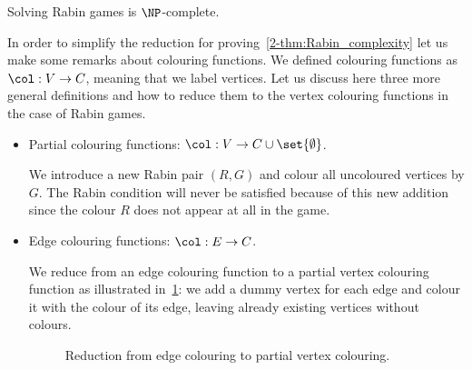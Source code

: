\begin{theorem}
\label{2-thm:Rabin_complexity}
Solving Rabin games is $\NP$-complete.
\end{theorem}

In order to simplify the reduction for proving~\cref{2-thm:Rabin_complexity} let us make some remarks about colouring functions.
We defined colouring functions as $\col : V \to C$, meaning that we label vertices.
Let us discuss here three more general definitions and how to reduce them to the vertex colouring functions
in the case of Rabin games.
\begin{itemize}
	\item Partial colouring functions: $\col : V \to C \cup \set{\emptyset}$.

We introduce a new Rabin pair $(R,G)$ and colour all uncoloured vertices by $G$.
The Rabin condition will never be satisfied because of this new addition 
since the colour $R$ does not appear at all in the game.

	\item Edge colouring functions: $\col : E \to C$.

We reduce from an edge colouring function to a partial vertex colouring function as illustrated in~\cref{2-fig:reduction_edge_colouring}:
we add a dummy vertex for each edge and colour it with the colour of its edge, leaving already existing vertices without colours. 

\begin{figure}[!ht]
\centering
\caption{Reduction from edge colouring to partial vertex colouring.}
\label{2-fig:reduction_edge_colouring}
\end{figure}
	

\end{itemize}
